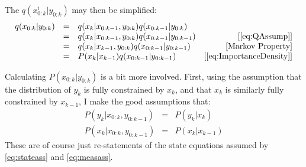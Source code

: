 The $q(x^i_{0:k} | y_{0:k})$ may then be simplified:
\begin{equation}
\begin{array}{cclr}
q(x_{0:k} | y_{0:k}) & = & q(x_k | x_{0:k-1}, y_{0:k})q(x_{0:k-1} | y_{0:k}) &  \\
& = & q(x_k | x_{0:k-1}, y_{0:k})q(x_{0:k-1} | y_{0:k-1})  & \text{[\autoref{eq:QAssump}]} \\
& = & q(x_k | x_{k-1}, y_{0:k})q(x_{0:k-1} | y_{0:k-1})  & \text{[Markov Property]}\\
& = & P(x_k | x_{k-1})q(x_{0:k-1} | y_{0:k-1})  & \text{[\autoref{eq:ImportanceDensity}]}
\end{array}
\end{equation}

Calculating $P(x_{0:k} | y_{0:k})$ is a bit more involved. 
First, using the assumption that the distribution of $y_k$ is 
fully constrained by $x_k$, and that $x_k$ is similarly fully 
constrained by $x_{k-1}$, I make the good assumptions that:
\begin{eqnarray}
P(y_k | x_{0:k}, y_{0:k-1}) &=& P(y_k | x_k) \nonumber \\
P(x_k | x_{0:k}, y_{0:k-1}) &=& P(x_k | x_{k-1})
\label{eq:MarkovProperty}
\end{eqnarray}
These are of course just re-statements of the state equations assumed by \autoref{eq:stateass}
and \autoref{eq:measass}.

